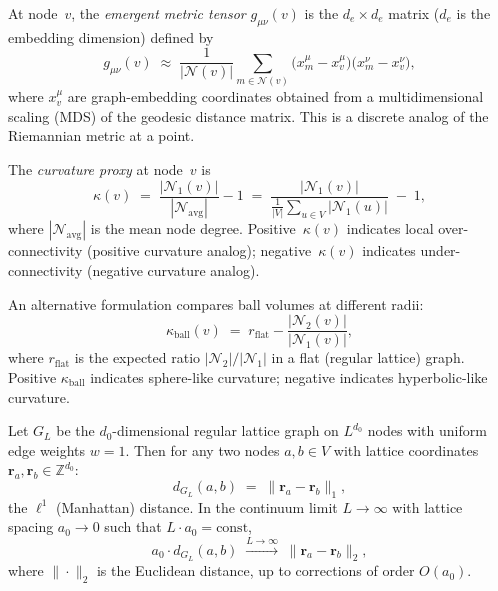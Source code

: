 \begin{definition}
\label{def:11.18}
At node~$v$, the \emph{emergent metric tensor}
$g_{\mu\nu}(v)$ is the $d_e \times d_e$ matrix ($d_e$ is the
embedding dimension) defined by
\begin{equation}
\label{eq:11.metric_tensor}
  g_{\mu\nu}(v)
  \;\approx\;
  \frac{1}{|\mathcal{N}(v)|}
  \sum_{m \in \mathcal{N}(v)}
  \bigl(x_m^\mu - x_v^\mu\bigr)
  \bigl(x_m^\nu - x_v^\nu\bigr),
\end{equation}
where $x_v^\mu$ are graph-embedding coordinates obtained from a
multidimensional scaling (MDS) of the geodesic distance matrix.
This is a discrete analog of the Riemannian metric at a point.
\end{definition}

\begin{definition}
\label{def:11.19}
The \emph{curvature proxy} at node~$v$ is
\begin{equation}
\label{eq:11.curvature}
  \kappa(v) \;=\;
  \frac{|\mathcal{N}_1(v)|}{|\mathcal{N}_{\mathrm{avg}}|} - 1
  \;=\;
  \frac{|\mathcal{N}_1(v)|}
       {\tfrac{1}{|V|}\sum_{u \in V} |\mathcal{N}_1(u)|}
  \;-\; 1,
\end{equation}
where $|\mathcal{N}_{\mathrm{avg}}|$ is the mean node degree.
Positive~$\kappa(v)$ indicates local over-connectivity (positive
curvature analog); negative~$\kappa(v)$ indicates under-connectivity
(negative curvature analog).

An alternative formulation compares ball volumes at different radii:
\begin{equation}
\label{eq:11.curvature_ball}
  \kappa_{\mathrm{ball}}(v) \;=\;
  r_{\mathrm{flat}} - \frac{|\mathcal{N}_2(v)|}{|\mathcal{N}_1(v)|},
\end{equation}
where $r_{\mathrm{flat}}$ is the expected ratio $|\mathcal{N}_2|
/ |\mathcal{N}_1|$ in a flat (regular lattice) graph.
Positive $\kappa_{\mathrm{ball}}$ indicates sphere-like curvature;
negative indicates hyperbolic-like curvature.
\end{definition}

\begin{theorem}
\label{thm:11.4}
Let $G_L$ be the $d_0$-dimensional regular lattice graph on
$L^{d_0}$ nodes with uniform edge weights $w = 1$.  Then for
any two nodes $a, b \in V$ with lattice coordinates
$\mathbf{r}_a, \mathbf{r}_b \in \mathbb{Z}^{d_0}$:
\[
  d_{G_L}(a, b) \;=\; \|\mathbf{r}_a - \mathbf{r}_b\|_1,
\]
the $\ell^1$ (Manhattan) distance.  In the continuum limit
$L \to \infty$ with lattice spacing $a_0 \to 0$ such that
$L \cdot a_0 = \text{const}$,
\[
  a_0 \cdot d_{G_L}(a, b)
  \;\xrightarrow{L \to \infty}\;
  \|\mathbf{r}_a - \mathbf{r}_b\|_2,
\]
where $\|\cdot\|_2$ is the Euclidean distance, up to corrections
of order $O(a_0)$.
\end{theorem}

